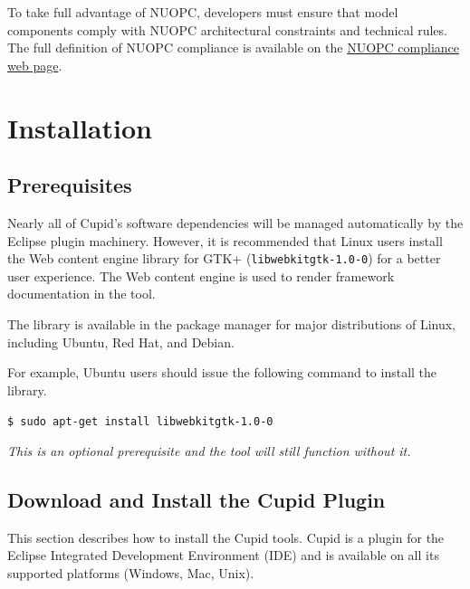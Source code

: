 \documentclass[oneside,11pt]{memoir}
\begin{document}
To take full advantage of NUOPC, developers must ensure that model components comply with NUOPC architectural constraints and technical rules. The full definition of NUOPC compliance is available on the \href{http://earthsystemcog.org/projects/nuopc/esmf2nuopc}{NUOPC compliance web page}. 


\chapter{Installation}

\section{Prerequisites}

Nearly all of Cupid's software dependencies will be managed automatically by the Eclipse plugin machinery.  However, it is recommended that Linux users install the Web content engine library for GTK+ (\texttt{libwebkitgtk-1.0-0}) for a better user experience.  The Web content engine is used to render framework documentation in the tool.

The library is available in the package manager for major distributions of Linux, including Ubuntu, Red Hat, and Debian.

For example, Ubuntu users should issue the following command to install the library.

\texttt{\$ sudo apt-get install libwebkitgtk-1.0-0}


\emph{This is an optional prerequisite and the tool will still function without it.}


\section{Download and Install the Cupid Plugin}
\label{sec:installcupid}

This section describes how to install the Cupid tools. Cupid is a plugin for the Eclipse Integrated Development Environment (IDE) and is available on all its supported platforms (Windows, Mac, Unix). 
\end{document}
